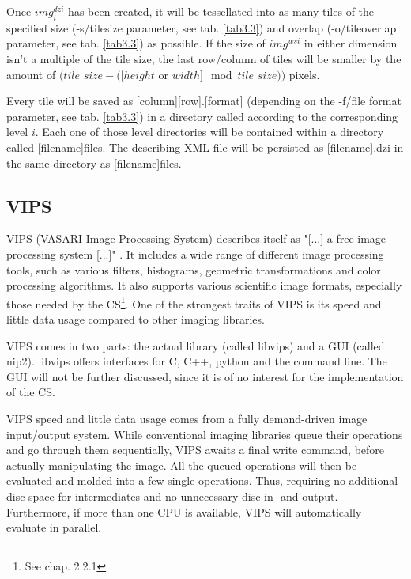 Once $img^{dzi}_i$ has been created, it will be tessellated into as many tiles of the specified size (-s/tile{\textunderscore}size parameter, see tab. \ref{tab3.3}) and overlap (-o/tile{\textunderscore}overlap parameter, see tab. \ref{tab3.3}) as possible. If the size of $img^{wsi}$ in either dimension isn't a multiple of the tile size, the last row/column of tiles will be smaller by the amount of $(tile$ $size - ([height$ or $width] \mod tile$ $size))$ pixels.

Every tile will be saved as [column]{\textunderscore}[row].[format] (depending on the -f/file{\textunderscore} format parameter, see tab. \ref{tab3.3}) in a directory called according to the corresponding level $i$. Each one of those level directories will be contained within a directory called [filename]{\textunderscore}files. The describing XML file will be persisted as [filename].dzi in the same directory as [filename]{\textunderscore}files.


\subsection{VIPS}

VIPS (VASARI Image Processing System) describes itself as "[...] a free image processing system [...]" \cite{web:vips}. It includes a wide range of different image processing tools, such as various filters, histograms, geometric transformations and color processing algorithms. It also supports various scientific image formats, especially those needed by the CS\footnote{See chap. 2.2.1}\cite{web:vips}. One of the strongest traits of VIPS is its speed and little data usage compared to other imaging libraries\cite{cupitt05}.

VIPS comes in two parts: the actual library (called libvips) and a GUI (called nip2). libvips offers interfaces for C, C++, python and the command line. The GUI will not be further discussed, since it is of no interest for the implementation of the CS. 

VIPS speed and little data usage comes from a fully demand-driven image input/output system. While conventional imaging libraries queue their operations and go through them sequentially, VIPS awaits a final write command, before actually manipulating the image. All the queued operations will then be evaluated and molded into a few single operations. Thus, requiring no additional disc space for intermediates and no unnecessary disc in- and output. Furthermore, if more than one CPU is available, VIPS will automatically evaluate in parallel\cite{cupitt96}.

